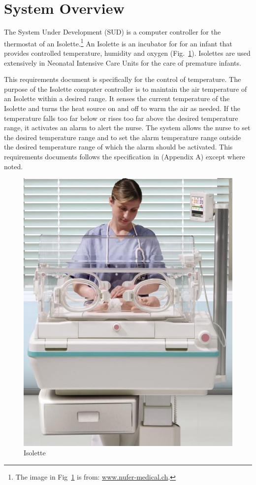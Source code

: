 \documentclass[fontsize=12pt,paper=letter,twoside]{scrartcl}
\begin{document}
\tableofcontents
\listoffigures
\listoftables
\newpage


\section{System Overview}

The System Under Development (SUD) is a computer controller for the thermostat of an Isolette.\footnote{%
The image in Fig~\ref{fig:isolette} is from: \url{www.nufer-medical.ch}.}
An Isolette is an incubator for for an infant that provides controlled temperature, humidity and oxygen (Fig.~\ref{fig:isolette}). Isolettes are used extensively in Neonatal Intensive Care Units for the care of premature infants.

This requirements document is specifically for the control of temperature. The purpose of the Isolette computer controller is to maintain the air temperature of an Isolette within a desired range. It senses the current temperature of the Isolette and turns the heat source on and off to warm the air as needed. If the temperature falls too far below or rises too far above the desired temperature range, it activates an alarm to alert the nurse. The system allows the nurse to set the desired temperature range and to set the alarm temperature range outside the desired temperature range of which the alarm should be activated. This requirements documents follows the specification in \cite{REMH} (Appendix A) except where noted.

\begin{figure}[!htb]
\begin{center}
\includegraphics[width=.4\textwidth]{images/isolette.png}
\end{center}
\caption{Isolette}
\label{fig:isolette}
\end{figure}
\end{document}
